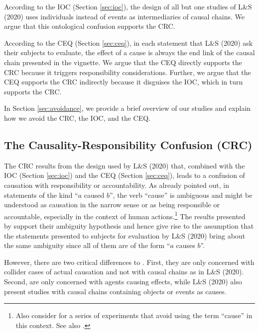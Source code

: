 \documentclass[egregdoesnotlikesansseriftitles,12pt]{scrartcl}
\begin{document}
According to the IOC (Section \ref{sec:ioc}), the design of all but one studies of L\&S (2020) uses individuals instead of events as intermediaries of causal chains. We argue that this ontological confusion supports the CRC.

According to the CEQ (Section \ref{sec:ceq}), in each statement that L\&S (2020) ask their subjects to evaluate, the effect of a cause is always the end link of the causal chain presented in the vignette. We argue that the CEQ directly supports the CRC because it triggers responsibility considerations. Further, we argue that the CEQ supports the CRC indirectly because it disguises the IOC, which in turn supports the CRC.

In Section \ref{sec:avoidance}, we provide a brief overview of our studies and explain how we avoid the CRC, the IOC, and the CEQ.

\subsection{The Causality-Responsibility Confusion (CRC)}\label{sec:crc}
The CRC results from the design used by L\&S (2020) that, combined with the IOC (Section \ref{sec:ioc}) and the CEQ (Section \ref{sec:ceq}), leads to a confusion of causation with responsibility or accountability. As \citet{samland_social_2014} already pointed out, in statements of the kind ``$a$ caused $b$'', the verb ``cause'' is ambiguous and might be understood as causation in the narrow sense or as being responsible or accountable, especially in the context of human actions.\footnote{Also consider \citet{schwenkler_cause_nodate} for a series of experiments that avoid using the term ``cause'' in this context. See also \citet{rose_cause_2021}.} The results presented by \citet{samland_social_2014} support their ambiguity hypothesis and hence give rise to the assumption that the statements presented to subjects for evaluation by L\&S (2020) bring about the same ambiguity since all of them are of the form ``$a$ causes $b$''.

However, there are two critical differences to \citet{samland_social_2014}. First, they are only concerned with collider cases of actual causation and not with causal chains as in L\&S (2020). Second, \citet{samland_social_2014} are only concerned with agents causing effects, while L\&S (2020) also present studies with causal chains containing objects or events as causes.
\end{document}
